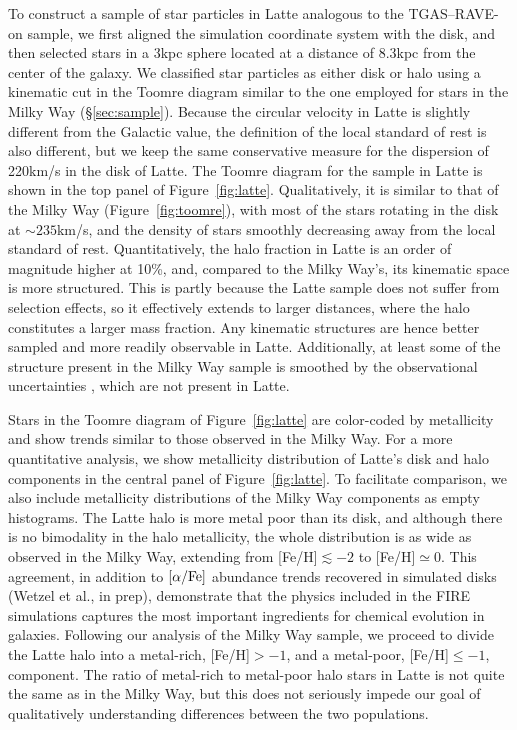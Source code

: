\documentclass[apj, twocolappendix, numberedappendix, appendixfloats]{emulateapj}
\begin{document}
To construct a sample of star particles in Latte analogous to the TGAS--RAVE-on sample, we first aligned the simulation coordinate system with the disk, and then selected stars in a 3\;kpc sphere located at a distance of 8.3\;kpc from the center of the galaxy.
We classified star particles as either disk or halo using a kinematic cut in the Toomre diagram similar to the one employed for stars in the Milky Way (\S\ref{sec:sample}).
Because the circular velocity in Latte is slightly different from the Galactic value, the definition of the local standard of rest is also different, but we keep the same conservative measure for the dispersion of 220\;km/s in the disk of Latte.
The Toomre diagram for the sample in Latte is shown in the top panel of Figure~\ref{fig:latte}.
Qualitatively, it is similar to that of the Milky Way (Figure~\ref{fig:toomre}), with most of the stars rotating in the disk at $\sim235$\;km/s, and the density of stars smoothly decreasing away from the local standard of rest.
Quantitatively, the halo fraction in Latte is an order of magnitude higher at 10\%, and, compared to the Milky Way's, its kinematic space is more structured.
This is partly because the Latte sample does not suffer from selection effects, so it effectively extends to larger distances, where the halo constitutes a larger mass fraction.
Any kinematic structures are hence better sampled and more readily observable in Latte.
Additionally, at least some of the structure present in the Milky Way sample is smoothed by the observational uncertainties \citep[see, e.g.,][]{sanderson2015}, which are not present in Latte.

Stars in the Toomre diagram of Figure~\ref{fig:latte} are color-coded by metallicity and show trends similar to those observed in the Milky Way.
For a more quantitative analysis, we show metallicity distribution of Latte's disk and halo components in the central panel of Figure~\ref{fig:latte}.
To facilitate comparison, we also include metallicity distributions of the Milky Way components as empty histograms.
The Latte halo is more metal poor than its disk, and although there is no bimodality in the halo metallicity, the whole distribution is as wide as observed in the Milky Way, extending from [Fe/H]$\lesssim-2$ to [Fe/H]$\simeq0$.
This agreement, in addition to $\rm[\alpha/Fe]$ abundance trends recovered in simulated disks (Wetzel et al., in prep), demonstrate that the physics included in the FIRE simulations captures the most important ingredients for chemical evolution in galaxies.
Following our analysis of the Milky Way sample, we proceed to divide the Latte halo into a metal-rich, [Fe/H]$>-1$, and a metal-poor, [Fe/H]$\leq-1$, component.
The ratio of metal-rich to metal-poor halo stars in Latte is not quite the same as in the Milky Way, but this does not seriously impede our goal of qualitatively understanding differences between the two populations.
\end{document}
